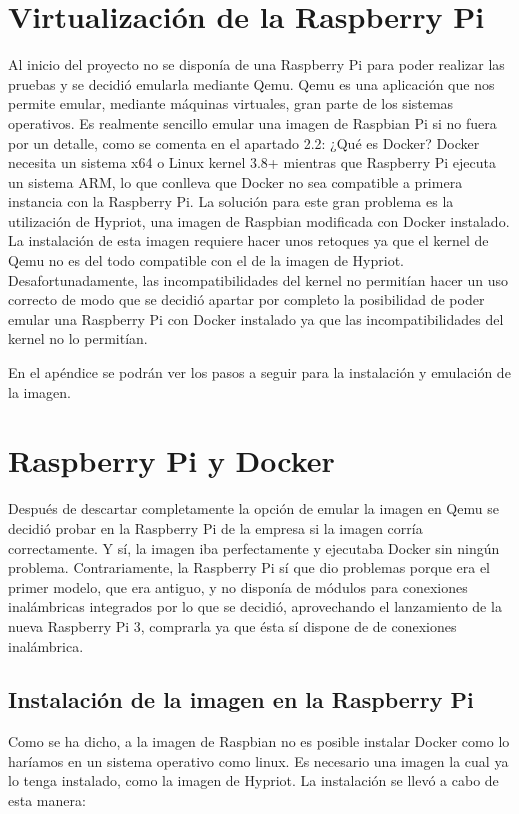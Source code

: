 \section{Virtualización de la Raspberry Pi}

Al inicio del proyecto no se disponía de una Raspberry Pi para poder realizar las pruebas y se decidió emularla mediante Qemu. 
Qemu es una aplicación que nos permite emular, mediante máquinas virtuales, gran parte de los sistemas operativos. 
Es realmente sencillo emular una imagen de Raspbian Pi si no fuera por un detalle, como se comenta en el apartado 2.2: ¿Qué es Docker? Docker necesita un sistema x64 o Linux kernel 3.8+ mientras que Raspberry Pi ejecuta un sistema ARM, lo que conlleva que Docker no sea compatible a primera instancia con la Raspberry Pi. 
La solución para este gran problema es la utilización de Hypriot, una imagen de Raspbian modificada con Docker instalado. 
La instalación de esta imagen requiere hacer unos retoques ya que el kernel de Qemu no es del todo compatible con el de la imagen de Hypriot. Desafortunadamente, las incompatibilidades del kernel no permitían hacer un uso correcto de modo que se decidió apartar por completo la posibilidad de poder emular una Raspberry Pi con Docker instalado ya que las incompatibilidades del kernel no lo permitían.

En el apéndice se podrán ver los pasos a seguir para la instalación y emulación de la imagen. 

\section{Raspberry Pi y Docker}

Después de descartar completamente la opción de emular la imagen en Qemu se decidió probar en la Raspberry Pi de la empresa si la imagen corría correctamente. Y sí, la imagen iba perfectamente y ejecutaba Docker sin ningún problema. Contrariamente, la Raspberry Pi sí que dio problemas porque era el primer modelo, que era antiguo, y no disponía de módulos para conexiones inalámbricas integrados por lo que se decidió, aprovechando el lanzamiento de la nueva Raspberry Pi 3, comprarla ya que ésta sí dispone de de conexiones inalámbrica. 

\subsection{Instalación de la imagen en la Raspberry Pi}

Como se ha dicho, a la imagen de Raspbian no es posible instalar Docker como lo haríamos en un sistema operativo como linux. Es necesario una imagen la cual ya lo tenga instalado, como la imagen de Hypriot. La instalación se llevó a cabo de esta manera:

